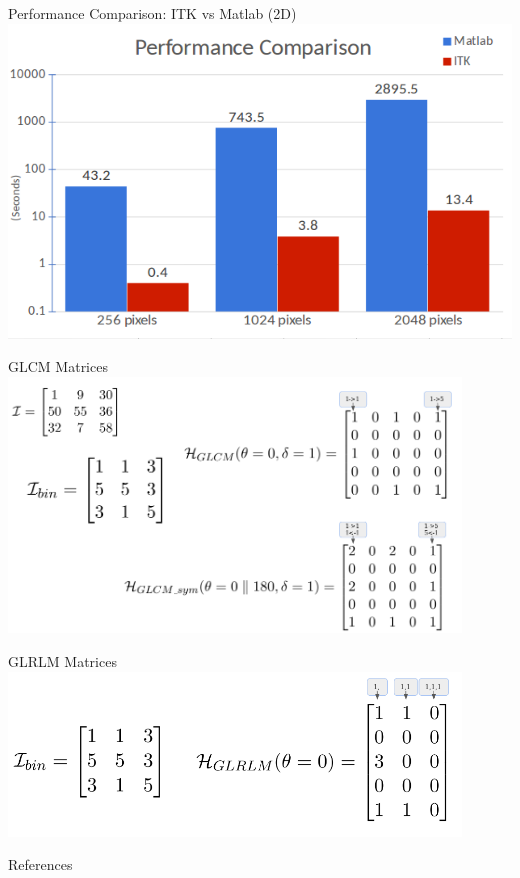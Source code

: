 \documentclass[10pt,aspectratio=169]{beamer}
\begin{document}
{
\begin{frame}[fragile]{Performance Comparison: ITK vs Matlab (2D)}
  \centering
  \includegraphics[height=0.9\textheight]{./figures/TextureFeaturesPerformanceComparison.png}
\end{frame}

\begin{frame}[fragile]{GLCM Matrices}
  \centering
  \includegraphics[width=0.9\textwidth]{./figures/GLCM_matrices.png}
\end{frame}

\begin{frame}[fragile]{GLRLM Matrices}
  \centering
  \includegraphics[width=0.9\textwidth]{./figures/GLRLM_matrices.png}
\end{frame}
}

\begin{frame}[allowframebreaks]{References}

  
  

\end{frame}
\end{document}
